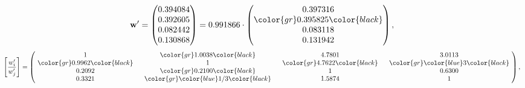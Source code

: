 \begin{example}
\begin{equation*}
\mathbf{w}^{\prime} =
\begin{pmatrix}
0.394084\\
0.392605\\
0.082442\\
0.130868
\end{pmatrix} =
0.991866\cdot
\begin{pmatrix}
0.397316\\
\color{gr} 0.395825\color{black} \\
0.083118\\
0.131942
\end{pmatrix},
\end{equation*}
\begin{equation*}
\left[ \frac{{w}^{\prime}_i}{{w}^{\prime}_j} \right] =
\begin{pmatrix}
$\,\,$ 1 $\,\,$ & $\,\,$\color{gr} 1.0038\color{black} $\,\,$ & $\,\,$4.7801$\,\,$ & $\,\,$3.0113$\,\,$ \\
$\,\,$\color{gr} 0.9962\color{black} $\,\,$ & $\,\,$ 1 $\,\,$ & $\,\,$\color{gr} 4.7622\color{black} $\,\,$ & $\,\,$\color{gr} \color{blue} 3\color{black}   $\,\,$ \\
$\,\,$0.2092$\,\,$ & $\,\,$\color{gr} 0.2100\color{black} $\,\,$ & $\,\,$ 1 $\,\,$ & $\,\,$0.6300 $\,\,$ \\
$\,\,$0.3321$\,\,$ & $\,\,$\color{gr} \color{blue}  1/3\color{black} $\,\,$ & $\,\,$1.5874$\,\,$ & $\,\,$ 1  $\,\,$ \\
\end{pmatrix},
\end{equation*}
\end{example}
\newpage
